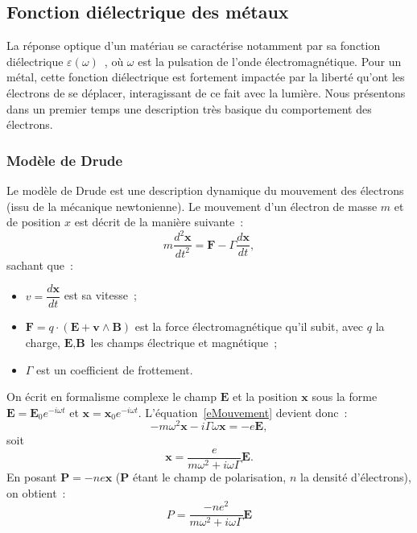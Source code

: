	\subsection{Fonction diélectrique des métaux}
La réponse optique d'un matériau se caractérise notamment par sa fonction diélectrique $\varepsilon(\omega)$~\cite{jacksonbook, palikbook}, où $\omega$ est la pulsation de l'onde électromagnétique. Pour un métal, cette fonction diélectrique est fortement impactée par la liberté qu'ont les électrons de se déplacer, interagissant de ce fait avec la lumière. Nous présentons dans un premier temps une description très basique du comportement des électrons.
		\subsubsection{Modèle de Drude}
Le modèle de Drude est une description dynamique du mouvement des électrons (issu de la mécanique newtonienne). Le mouvement d'un électron de masse $m$ et de position $x$ est décrit de la manière suivante~:
\begin{equation}
m\dfrac{d^2\textbf{x}}{dt^2} = \textbf{F}-\Gamma\dfrac{d\textbf{x}}{dt},
\label{eMouvement}
\end{equation}
sachant que~:
\begin{itemize}
\item $v = \dfrac{d\textbf{x}}{dt} $ est sa vitesse~;
\item $\textbf{F} = q\cdot(\textbf{E}+\textbf{v}\wedge \textbf{B})$ est la force électromagnétique qu'il subit, avec $q$ la charge, $\textbf{E}, \textbf{B}$ les champs électrique et magnétique~;
\item $\Gamma$ est un coefficient de frottement.
\end{itemize}
On écrit en formalisme complexe le champ $\textbf{E}$ et la position $\textbf{x}$ sous la forme $\textbf{E}=\textbf{E}_0e^{-i\omega t}$ et $\textbf{x}=\textbf{x}_0e^{-i\omega t}$. L'équation~\ref{eMouvement} devient donc~:
\begin{equation}
-m\omega^2 \textbf{x}-i\Gamma\omega\textbf{x} = -e\textbf{E},
\end{equation}
soit
\begin{equation}
\textbf{x} = \dfrac{e}{m\omega^2+i\omega\Gamma}\textbf{E}.
\end{equation}
En posant $\textbf{P} = -ne\textbf{x}$ ($\textbf{P}$ étant le champ de polarisation, $n$ la densité d'électrons), on obtient~:
\begin{equation}
P = \dfrac{-ne^2}{m\omega^2+i\omega\Gamma}\textbf{E}
\end{equation}
